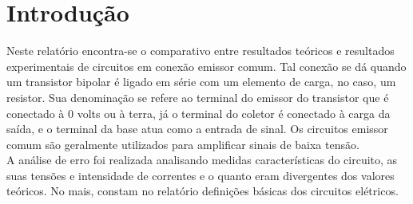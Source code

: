 \chapter*[Introdu\c{c}\~{a}o]{Introdu\c{c}\~{a}o}
Neste relatório encontra-se o comparativo entre resultados teóricos e resultados experimentais de circuitos em conexão emissor comum.
Tal conexão se dá quando um transistor bipolar é ligado em série com um elemento de carga, no caso, um resistor. Sua denominação se refere ao terminal do emissor do transistor que é conectado à 0 volts ou à terra, já o terminal do coletor é conectado à carga da saída, e o terminal da base atua como a entrada de sinal. Os circuitos emissor comum são geralmente utilizados para amplificar sinais de baixa tensão.\\
A análise de erro foi realizada analisando medidas características do circuito, as suas tensões e intensidade de correntes e o quanto eram divergentes dos valores teóricos. No mais, constam no relatório definições básicas dos circuitos elétricos.
